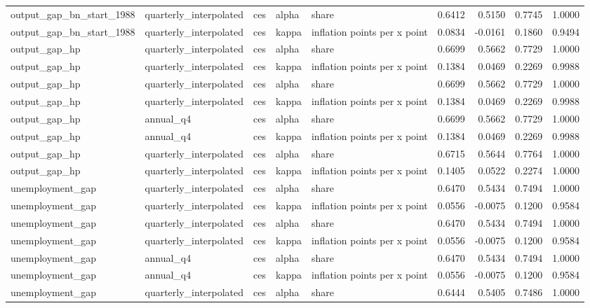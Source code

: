 \begin{tabular}{lllllrrrr}
output\_gap\_bn\_start\_1988 & quarterly\_interpolated & ces & alpha & share & 0.6412 & 0.5150 & 0.7745 & 1.0000 \\
output\_gap\_bn\_start\_1988 & quarterly\_interpolated & ces & kappa & inflation points per x point & 0.0834 & -0.0161 & 0.1860 & 0.9494 \\
output\_gap\_hp & quarterly\_interpolated & ces & alpha & share & 0.6699 & 0.5662 & 0.7729 & 1.0000 \\
output\_gap\_hp & quarterly\_interpolated & ces & kappa & inflation points per x point & 0.1384 & 0.0469 & 0.2269 & 0.9988 \\
output\_gap\_hp & quarterly\_interpolated & ces & alpha & share & 0.6699 & 0.5662 & 0.7729 & 1.0000 \\
output\_gap\_hp & quarterly\_interpolated & ces & kappa & inflation points per x point & 0.1384 & 0.0469 & 0.2269 & 0.9988 \\
output\_gap\_hp & annual\_q4 & ces & alpha & share & 0.6699 & 0.5662 & 0.7729 & 1.0000 \\
output\_gap\_hp & annual\_q4 & ces & kappa & inflation points per x point & 0.1384 & 0.0469 & 0.2269 & 0.9988 \\
output\_gap\_hp & quarterly\_interpolated & ces & alpha & share & 0.6715 & 0.5644 & 0.7764 & 1.0000 \\
output\_gap\_hp & quarterly\_interpolated & ces & kappa & inflation points per x point & 0.1405 & 0.0522 & 0.2274 & 1.0000 \\
unemployment\_gap & quarterly\_interpolated & ces & alpha & share & 0.6470 & 0.5434 & 0.7494 & 1.0000 \\
unemployment\_gap & quarterly\_interpolated & ces & kappa & inflation points per x point & 0.0556 & -0.0075 & 0.1200 & 0.9584 \\
unemployment\_gap & quarterly\_interpolated & ces & alpha & share & 0.6470 & 0.5434 & 0.7494 & 1.0000 \\
unemployment\_gap & quarterly\_interpolated & ces & kappa & inflation points per x point & 0.0556 & -0.0075 & 0.1200 & 0.9584 \\
unemployment\_gap & annual\_q4 & ces & alpha & share & 0.6470 & 0.5434 & 0.7494 & 1.0000 \\
unemployment\_gap & annual\_q4 & ces & kappa & inflation points per x point & 0.0556 & -0.0075 & 0.1200 & 0.9584 \\
unemployment\_gap & quarterly\_interpolated & ces & alpha & share & 0.6444 & 0.5405 & 0.7486 & 1.0000 \\

\end{tabular}
